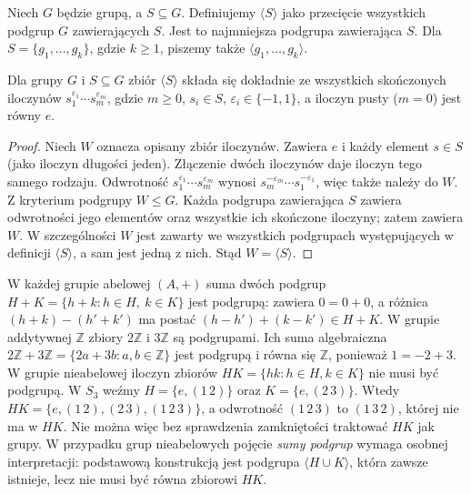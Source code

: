 \begin{definicja}
\label{aa:def:generatory}
Niech $G$ będzie grupą, a $S\subseteq G$. Definiujemy $\langle S\rangle$ jako
przecięcie wszystkich podgrup $G$ zawierających $S$.
Jest to najmniejsza podgrupa zawierająca $S$.
Dla $S=\{g_1,\ldots,g_k\}$, gdzie $k\ge1$, piszemy także
$\langle g_1,\ldots,g_k\rangle$.
\end{definicja}

\begin{twierdzenie}
\label{aa:tw:slowa}
Dla grupy $G$ i $S\subseteq G$ zbiór $\langle S\rangle$ składa się
dokładnie ze wszystkich skończonych iloczynów
$s_1^{\varepsilon_1}\cdots s_m^{\varepsilon_m}$,
gdzie $m\ge0$, $s_i\in S$, $\varepsilon_i\in\{-1,1\}$,
a iloczyn pusty ($m=0$) jest równy $e$.
\end{twierdzenie}
\begin{proof}
Niech $W$ oznacza opisany zbiór iloczynów. Zawiera $e$
i każdy element $s\in S$ (jako iloczyn długości jeden).
Złączenie dwóch iloczynów daje iloczyn tego samego rodzaju.
Odwrotność $s_1^{\varepsilon_1}\cdots s_m^{\varepsilon_m}$
wynosi $s_m^{-\varepsilon_m}\cdots s_1^{-\varepsilon_1}$,
więc także należy do $W$. Z kryterium podgrupy $W\le G$.
Każda podgrupa zawierająca $S$ zawiera odwrotności jego
elementów oraz wszystkie ich skończone iloczyny; zatem zawiera $W$.
W szczególności $W$ jest zawarty we wszystkich podgrupach
występujących w definicji $\langle S\rangle$, a sam jest jedną
z nich. Stąd $W=\langle S\rangle$.
\end{proof}

\begin{przyklad}
W każdej grupie abelowej $(A,+)$ suma dwóch podgrup
$H+K=\{h+k:h\in H,\ k\in K\}$ jest podgrupą:
zawiera $0=0+0$, a różnica $(h+k)-(h' +k')$
ma postać $(h-h')+(k-k')\in H+K$.
W grupie addytywnej $\mathbb Z$ zbiory $2\mathbb Z$ i $3\mathbb Z$
są podgrupami. Ich suma algebraiczna
$2\mathbb Z+3\mathbb Z=\{2a+3b:a,b\in\mathbb Z\}$
jest podgrupą i równa się $\mathbb Z$, ponieważ $1=-2+3$.
W grupie nieabelowej iloczyn zbiorów $HK=\{hk:h\in H,k\in K\}$
nie musi być podgrupą. W $S_3$ weźmy
$H=\{e,(1\,2)\}$ oraz $K=\{e,(2\,3)\}$.
Wtedy $HK=\{e,(1\,2),(2\,3),(1\,2\,3)\}$,
a odwrotność $(1\,2\,3)$ to $(1\,3\,2)$, której nie ma w $HK$.
Nie można więc bez sprawdzenia zamkniętości traktować $HK$ jak grupy.
W przypadku grup nieabelowych pojęcie \emph{sumy podgrup}
wymaga osobnej interpretacji: podstawową konstrukcją jest
podgrupa $\langle H\cup K\rangle$, która zawsze istnieje,
lecz nie musi być równa zbiorowi $HK$.
\end{przyklad}

